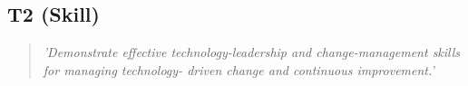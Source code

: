 \subsection{T2 (Skill)}

  \begin{quote}
    \textit{'Demonstrate effective technology-leadership
    and change-management skills for managing technology-
    driven change and continuous improvement.'}
  \end{quote}

\newpage